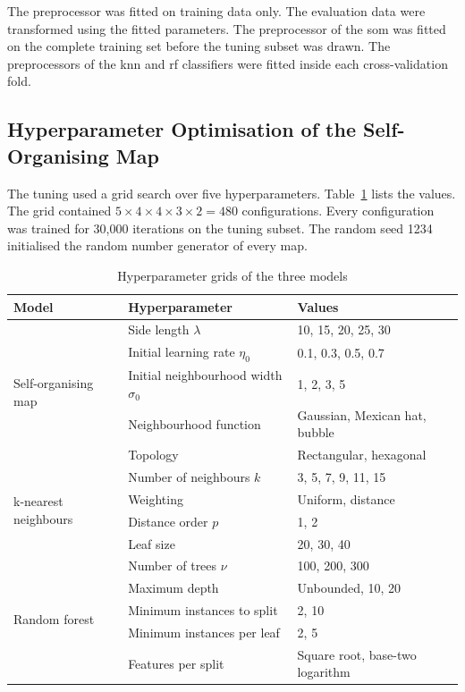 \documentclass[conference]{IEEEtran}
\begin{document}
The preprocessor was fitted on training data only.
The evaluation data were transformed using the fitted parameters.
The preprocessor of the \gls{som} was fitted on the complete training set before the tuning subset was drawn.
The preprocessors of the \gls{knn} and \gls{rf} classifiers were fitted inside each cross-validation fold.

\subsection{Hyperparameter Optimisation of the Self-Organising Map}
\label{sub:somtune}

The tuning used a grid search over five hyperparameters.
Table~\ref{tab:grids} lists the values.
The grid contained $5 \times 4 \times 4 \times 3 \times 2 = 480$ configurations.
Every configuration was trained for 30,000 iterations on the tuning subset.
The random seed 1234 initialised the random number generator of every map.

\begin{table}[!t]
\centering
\caption{Hyperparameter grids of the three models}
\label{tab:grids}
\footnotesize
\begin{tabular}{llp{9.5cm}}
\toprule
\textbf{Model} & \textbf{Hyperparameter} & \textbf{Values} \\
\midrule
\multirow{5}{*}{Self-organising map} & Side length $\lambda$ & 10, 15, 20, 25, 30 \\
 & Initial learning rate $\eta_0$ & 0.1, 0.3, 0.5, 0.7 \\
 & Initial neighbourhood width $\sigma_0$ & 1, 2, 3, 5 \\
 & Neighbourhood function & Gaussian, Mexican hat, bubble \\
 & Topology & Rectangular, hexagonal \\
\midrule
\multirow{4}{*}{k-nearest neighbours} & Number of neighbours $k$ & 3, 5, 7, 9, 11, 15 \\
 & Weighting & Uniform, distance \\
 & Distance order $p$ & 1, 2 \\
 & Leaf size & 20, 30, 40 \\
\midrule
\multirow{5}{*}{Random forest} & Number of trees $\nu$ & 100, 200, 300 \\
 & Maximum depth & Unbounded, 10, 20 \\
 & Minimum instances to split & 2, 10 \\
 & Minimum instances per leaf & 2, 5 \\
 & Features per split & Square root, base-two logarithm \\
\bottomrule
\end{tabular}
\end{table}
\end{document}
